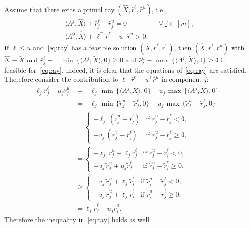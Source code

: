 \documentclass[10pt, a4paper]{article}
\newcommand{\skal}[2]{\langle{#1},{#2}\rangle}
\newcommand{\T}{^{\top}}
\begin{document}
Assume that there exits a primal ray $(\hat{X}, \hat{r}^\ell, \hat{r}^u)$,
i.e.,
\begin{equation}\label{eq:ray}
\begin{aligned}
  & \skal{A^j}{\hat{X}} + \hat{r}^\ell_j - \hat{r}^u_j = 0 && \forall\; j \in [m],\\
  & \skal{A^0}{\hat{X}} + \ell\T \hat{r}^\ell - u\T \hat{r}^u > 0.
\end{aligned}
\end{equation}
If $\ell \leq u$ and~\eqref{eq:ray} has a feasible solution
$(\tilde{X}, \tilde{r}^\ell, \tilde{r}^u)$, then
$(\hat{X}, \hat{r}^\ell, \hat{r}^u)$ with $\hat{X} = \tilde{X}$ and
$\hat{r}^\ell_j = - \min\,\{\skal{A^j}{\tilde{X}}, 0\} \geq 0$ and
$\hat{r}^u_j = \max\,\{\skal{A^j}{\tilde{X}}, 0\} \geq 0$ is feasible
for~\eqref{eq:ray}. Indeed, it is clear that the equations
of~\eqref{eq:ray} are satisfied. Therefore consider the contribution to
$\ell\T \hat{r}^\ell - u\T \hat{r}^u$ in component $j$:
\begin{align*}
  \ell_j \hat{r}^\ell_j - u_j \hat{r}^u_j & = - \ell_j\, \min\,\{\skal{A^j}{\tilde{X}}, 0\} - u_j\, \max\,\{\skal{A^j}{\tilde{X}}, 0\}\\
  & = - \ell_j\, \min\,\{\tilde{r}^u_j - \tilde{r}^\ell_j, 0\} - u_j\, \max\,\{\tilde{r}^u_j - \tilde{r}^\ell_j, 0\}\\
  & = \begin{cases}
    - \ell_j\, (\tilde{r}^u_j - \tilde{r}^\ell_j) & \text{if } \tilde{r}^u_j - \tilde{r}^\ell_j < 0,\\
    - u_j\, (\tilde{r}^u_j - \tilde{r}^\ell_j) & \text{if } \tilde{r}^u_j - \tilde{r}^\ell_j \geq 0,
  \end{cases}\\
  & = \begin{cases}
    - \ell_j\, \tilde{r}^u_j + \ell_j \tilde{r}^\ell_j & \text{if } \tilde{r}^u_j - \tilde{r}^\ell_j < 0,\\
    - u_j\, \tilde{r}^u_j + u_j \tilde{r}^\ell_j & \text{if } \tilde{r}^u_j - \tilde{r}^\ell_j \geq 0,
  \end{cases}\\
  & \geq \begin{cases}
    - u_j\, \tilde{r}^u_j + \ell_j \tilde{r}^\ell_j & \text{if }  \tilde{r}^u_j - \tilde{r}^\ell_j < 0,\\
    - u_j\, \tilde{r}^u_j + \ell_j \tilde{r}^\ell_j & \text{if } \tilde{r}^u_j - \tilde{r}^\ell_j \geq 0,
  \end{cases}\\
  & = \ell_j \tilde{r}^\ell_j - u_j \tilde{r}^u_j.
\end{align*}
Therefore the inequality in~\eqref{eq:ray} holds as well.
\end{document}

